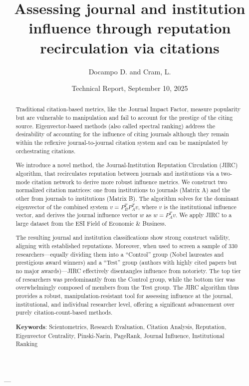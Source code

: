 \documentclass[10pt]{article}
\title{Assessing journal and institution influence through reputation recirculation via citations}
\date{Technical Report, September 10, 2025}
\author{Docampo D. and Cram, L.}
\begin{document}
\maketitle

\begin{abstract}

Traditional citation-based metrics, like the Journal Impact Factor, measure popularity but are vulnerable to manipulation and fail to account for the prestige of the citing source. Eigenvector-based methods (also called spectral ranking) address the desirability of accounting for the influence of citing journals although they remain within the reflexive journal-to-journal citation system and can be manipulated by orchestrating citations.

 We introduce a novel method, the Journal-Institution Reputation Circulation (JIRC) algorithm, that recirculates reputation between journals and institutions via a two-mode citation network to derive more robust influence metrics.
We construct two normalized citation matrices: one from institutions to journals (Matrix A) and the other from journals to institutions (Matrix B). The algorithm solves for the dominant eigenvector of the combined system \(v = P_B^T P_A^T v\), where \(v\) is the institutional influence vector, and derives the journal influence vector \(w\) as \(w = P_A^T v\). We apply JIRC to a large dataset from the ESI Field of Economic \& Business.

The resulting journal and institution classifications show strong construct validity, aligning with established reputations. Moreover, when used to screen a sample of 330 researchers—equally dividing them into a ``Control'' group (Nobel laureates and prestigious award winners) and a ``Test'' group (authors with highly cited papers but no major awards)—JIRC effectively disentangles influence from notoriety. The top tier of researchers was predominantly from the Control group, while the bottom tier was overwhelmingly composed of members from the Test group. The JIRC algorithm thus provides a robust, manipulation-resistant tool for assessing influence at the journal, institutional, and individual researcher level, offering a significant advancement over purely citation-count-based methods.

{\bfseries Keywords}: Scientometrics, Research Evaluation, Citation Analysis, Reputation, Eigenvector Centrality, Pinski-Narin, PageRank, Journal Influence, Institutional Ranking
 \end{abstract}
---
\end{document}
